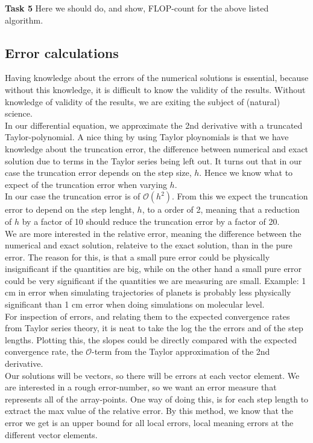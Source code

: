 \documentclass{article}
\begin{document}
\textbf{Task 5} Here we should do, and show, FLOP-count for the above listed algorithm.

\subsection{Error calculations}
Having knowledge about the errors of the numerical solutions is essential, because without this knowledge, it is difficult to know the validity of the results. Without knowledge of validity of the results, we are exiting the subject of (natural) science. \\

In our differential equation, we approximate the 2nd derivative with a truncated Taylor-polynomial. A nice thing by using Taylor ploynomials is that we have knowledge about the truncation error, the difference between numerical and exact solution due to terms in the Taylor series being left out. It turns out that in our case the truncation error depends on the step size, $h$. Hence we know what to expect of the truncation error when varying $h$. \\

In our case the truncation error is of $\mathcal{O}(h^2)$. From this we expect the truncation error to depend on the step lenght, $h$, to a order of 2, meaning that a reduction of $h$ by a factor of 10 should reduce the truncation error by a factor of 20.\\

We are more interested in the relative error, meaning the difference between the numerical and exact solution, relateive to the exact solution, than in the pure error. The reason for this, is that a small pure error could be physically insignificant if the quantities are big, while on the other hand a small pure error could be very significant if the quantities we are measuring are small. Example: 1 cm in error when simulating trajectories of planets is probably less physically significant than 1 cm error when doing simulations on molecular level.\\

For inspection of errors, and relating them to the expected convergence rates from Taylor series theory, it is neat to take the log the the errors and of the step lengths. Plotting this, the slopes could be directly compared with the expected convergence rate, the $\mathcal{O}$-term from the Taylor approximation of the 2nd derivative.\\

Our solutions will be vectors, so there will be errors at each vector element. We are interested in a rough error-number, so we want an error measure that represents all of the array-points. One way of doing this, is for each step length to extract the max value of the relative error. By this method, we know that the error we get is an upper bound for all local errors, local meaning errors at the different vector elements.\\
\end{document}
